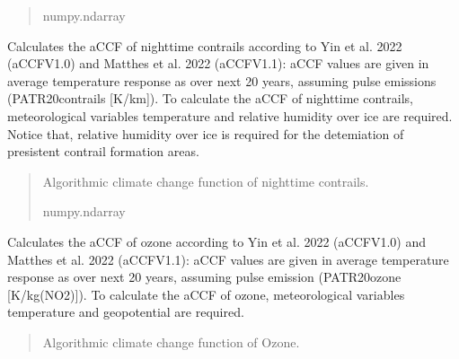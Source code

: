 \documentclass[a4paper,11pt,english]{sphinxmanual}
\begin{document}
\begin{fulllineitems}
\begin{fulllineitems}
\begin{quote}
\begin{description}
\sphinxAtStartPar
numpy.ndarray

\end{description}\end{quote}

\end{fulllineitems}


\begin{fulllineitems}
\label{\detokenize{modules:climaccf.accf.GeTaCCFs.accf_ncontrail}}
\pysigstartsignatures
{}
\pysigstopsignatures
\sphinxAtStartPar
Calculates the aCCF of night\sphinxhyphen{}time contrails according to Yin et al. 2022 (aCCF\sphinxhyphen{}V1.0) and Matthes et al. 2022 (aCCF\sphinxhyphen{}V1.1): aCCF values are  given in average 
temperature response as over next 20 years, assuming pulse emissions (P\sphinxhyphen{}ATR20\sphinxhyphen{}contrails {[}K/km{]}). To calculate the aCCF of night\sphinxhyphen{}time contrails,
meteorological variables temperature and relative humidity over ice are required. Notice that,
relative humidity over ice is required for the detemiation of presistent contrail formation areas.
\begin{quote}\begin{description}
\sphinxAtStartPar
Algorithmic climate change function of nighttime contrails.

\sphinxAtStartPar
numpy.ndarray

\end{description}\end{quote}

\end{fulllineitems}


\begin{fulllineitems}
\label{\detokenize{modules:climaccf.accf.GeTaCCFs.accf_o3}}
\pysigstartsignatures
{}
\pysigstopsignatures
\sphinxAtStartPar
Calculates the aCCF of ozone according to Yin et al. 2022 (aCCF\sphinxhyphen{}V1.0) and Matthes et al. 2022 (aCCF\sphinxhyphen{}V1.1): aCCF values are  given in 
average temperature response as over next 20 years, assuming pulse emission (P\sphinxhyphen{}ATR20\sphinxhyphen{}ozone {[}K/kg(NO2){]}). To calculate the aCCF of ozone, 
meteorological variables temperature and geopotential are required.
\begin{quote}\begin{description}
\sphinxAtStartPar
Algorithmic climate change function of Ozone.


\end{description}
\end{quote}
\end{fulllineitems}
\end{fulllineitems}
\end{document}

